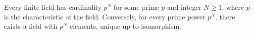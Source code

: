 Every finite field has cardinality $p^N$ for some prime $p$ and integer $N \geq 1$, where $p$ is the characteristic of the field. Conversely, for every prime power $p^N$, there exists a field with $p^N$ elements, unique up to isomorphism.

